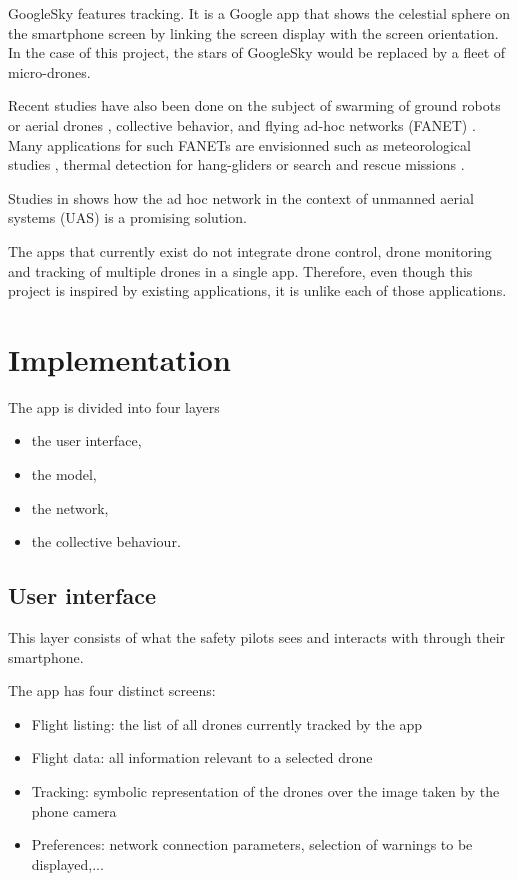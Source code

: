 \documentclass[conference]{IEEEtran}
\begin{document}
GoogleSky \cite{GoogleSky} features tracking. It is a Google app that shows  the celestial sphere on the smartphone screen by linking the screen display with the screen orientation. In the case of this project, the stars of GoogleSky would be replaced by a fleet of micro-drones. 

Recent studies have also been done on the subject of swarming of ground robots or aerial drones \cite{Vasarhelyi14}, collective behavior, and flying ad-hoc networks (FANET) \cite{VeyPRG14, RoyerPG13}. Many applications for such FANETs are envisionned such as meteorological studies  \cite{hattenberger13}, thermal detection for hang-gliders \cite{eckert2013flying} or search and rescue missions \cite{Cubber13}.

Studies in \cite{Abrassart14, bouachir14} shows how the ad hoc network in the context of unmanned aerial systems (UAS) is a promising solution.

The apps that currently exist do not integrate drone control, drone monitoring and tracking of multiple drones in a single app. Therefore, even though this project is inspired by existing applications, it is unlike each of those applications.


\section{Implementation}
The app is divided into four layers
\begin{itemize}
\item the user interface,
\item the model,
\item the network,
\item the collective behaviour.
\end{itemize}

\subsection{User interface}
This layer consists of what the safety pilots sees and interacts with through their smartphone.

The app has four distinct screens:
\begin{itemize}
\item Flight listing: the list of all drones currently tracked by the app
\item Flight data: all information relevant to a selected drone
\item Tracking: symbolic representation of the drones over the image taken by the phone camera
\item Preferences: network connection parameters, selection of warnings to be displayed,...
\end{itemize}
\end{document}
